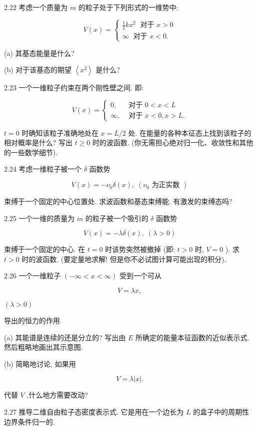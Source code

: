 \documentclass[lang=cn,newtx,10pt,scheme=chinese,thmcnt=section]{elegantbook}
\begin{document}
2.22 考虑一个质量为 $m$ 的粒子处于下列形式的一维势中:

$$
V\left( x\right) = \left\{ \begin{array}{l} \frac{1}{2}k{x}^{2}\;\text{ 对于 }x > 0 \\ \infty \;\text{ 对于 }x < 0. \end{array}\right.
$$

(a) 其基态能量是什么?

(b) 对于该基态的期望 $\left\langle {x}^{2}\right\rangle$ 是什么?

2.23 一个一维粒子约束在两个刚性壁之间. 即:

$$
V\left( x\right) = \left\{ \begin{array}{ll} 0, & \text{ 对于 }0 < x < L \\ \infty , & \text{ 对于 }x < 0, x > L. \end{array}\right.
$$

$t = 0$ 时确知该粒子准确地处在 $x = L/2$ 处. 在能量的各种本征态上找到该粒子的相对概率是什么? 写出 $t \geq 0$ 时的波函数. (你无需担心绝对归一化、收敛性和其他的一些数学细节).

2.24 考虑一维粒子被一个 $\delta$ 函数势

$$
V\left( x\right) = - {\nu }_{0}\delta \left( x\right) ,\;\left( {{\nu }_{0}\text{ 为正实数 }}\right)
$$

束缚于一个固定的中心位置处. 求波函数和基态束缚能. 有激发的束缚态吗?

2.25 一个一维的质量为 $m$ 的粒子被一个吸引的 $\delta$ 函数势

$$
V\left( x\right) = - {\lambda \delta }\left( x\right) ,\;\left( {\lambda > 0}\right)
$$

束缚于一个固定的中心. 在 $t = 0$ 时该势突然被撤掉 (即: $t > 0$ 时, $V = 0$ ). 求 $t > 0$ 时的波函数. (要定量地求解! 但是你不必试图计算可能出现的积分).

2.26 一个一维粒子 $\left( {-\infty < x < \infty }\right)$ 受到一个可从

$$
V = {\lambda x},
$$

$\left( {\lambda > 0}\right)$

导出的恒力的作用.

(a) 其能谱是连续的还是分立的? 写出由 $E$ 所确定的能量本征函数的近似表示式. 然后粗略地画出其示意图.

(b) 简略地讨论, 如果用

$$
V = \lambda \left| x\right| \text{.}
$$

代替 $V$ ,什么地方需要改动?

2.27 推导二维自由粒子态密度表示式. 它是用在一个边长为 $L$ 的盒子中的周期性边界条件归一的.
\end{document}
